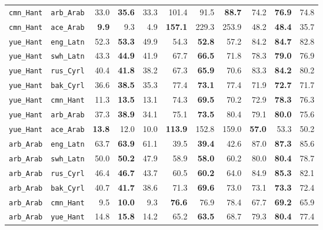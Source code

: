\begin{longtable}{@{}ll rrr rrr rrr@{}}
\texttt{cmn\_Hant} & \texttt{arb\_Arab} & 33.0 & \textbf{35.6} & 33.3 & 101.4 & 91.5 & \textbf{88.7} & 74.2 & \textbf{76.9} & 74.8 \\
\texttt{cmn\_Hant} & \texttt{ace\_Arab} & \textbf{9.9} & 9.3 & 4.9 & \textbf{157.1} & 229.3 & 253.9 & 48.2 & \textbf{48.4} & 35.7 \\
\addlinespace
\texttt{yue\_Hant} & \texttt{eng\_Latn} & 52.3 & \textbf{53.3} & 49.9 & 54.3 & \textbf{52.8} & 57.2 & 84.2 & \textbf{84.7} & 82.8 \\
\texttt{yue\_Hant} & \texttt{swh\_Latn} & 43.3 & \textbf{44.9} & 41.9 & 67.7 & \textbf{66.5} & 71.8 & 78.3 & \textbf{79.0} & 76.9 \\
\texttt{yue\_Hant} & \texttt{rus\_Cyrl} & 40.4 & \textbf{41.8} & 38.2 & 67.3 & \textbf{65.9} & 70.6 & 83.3 & \textbf{84.2} & 80.2 \\
\texttt{yue\_Hant} & \texttt{bak\_Cyrl} & 36.6 & \textbf{38.5} & 35.3 & 77.4 & \textbf{73.1} & 77.4 & 71.9 & \textbf{72.7} & 71.7 \\
\texttt{yue\_Hant} & \texttt{cmn\_Hant} & 11.3 & \textbf{13.5} & 13.1 & 74.3 & \textbf{69.5} & 70.2 & 72.9 & \textbf{78.3} & 76.3 \\
\texttt{yue\_Hant} & \texttt{arb\_Arab} & 37.3 & \textbf{38.9} & 34.1 & 75.1 & \textbf{73.5} & 80.4 & 79.1 & \textbf{80.0} & 75.6 \\
\texttt{yue\_Hant} & \texttt{ace\_Arab} & \textbf{13.8} & 12.0 & 10.0 & \textbf{113.9} & 152.8 & 159.0 & \textbf{57.0} & 53.3 & 50.2 \\
\addlinespace
\texttt{arb\_Arab} & \texttt{eng\_Latn} & 63.7 & \textbf{63.9} & 61.1 & 39.5 & \textbf{39.4} & 42.6 & 87.0 & \textbf{87.3} & 85.6 \\
\texttt{arb\_Arab} & \texttt{swh\_Latn} & 50.0 & \textbf{50.2} & 47.9 & 58.9 & \textbf{58.0} & 60.2 & 80.0 & \textbf{80.4} & 78.7 \\
\texttt{arb\_Arab} & \texttt{rus\_Cyrl} & 46.4 & \textbf{46.7} & 43.7 & 60.5 & \textbf{60.2} & 64.0 & 84.9 & \textbf{85.3} & 82.1 \\
\texttt{arb\_Arab} & \texttt{bak\_Cyrl} & 40.7 & \textbf{41.7} & 38.6 & 71.3 & \textbf{69.6} & 73.0 & 73.1 & \textbf{73.3} & 72.4 \\
\texttt{arb\_Arab} & \texttt{cmn\_Hant} & 9.5 & \textbf{10.0} & 9.3 & \textbf{76.6} & 76.9 & 78.4 & 67.7 & \textbf{69.2} & 65.9 \\
\texttt{arb\_Arab} & \texttt{yue\_Hant} & 14.8 & \textbf{15.8} & 14.2 & 65.2 & \textbf{63.5} & 68.7 & 79.3 & \textbf{80.4} & 77.4 \\

\end{longtable}
